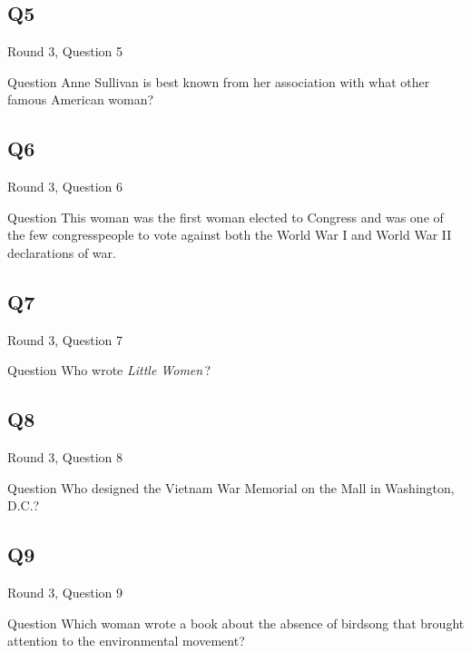 \documentclass[11pt]{beamer}
\begin{document}
\subsection*{Q5}
\begin{frame}[t]{Round 3, Question 5}
\vspace{0.5em}
\begin{block}{Question}
Anne Sullivan is best known from her association with what other famous American woman?
\end{block}
\end{frame}
    

\subsection*{Q6}
\begin{frame}[t]{Round 3, Question 6}
\vspace{0.5em}
\begin{block}{Question}
This woman was the first woman elected to Congress and was one of the few congresspeople to vote against both the World War I and World War II declarations of war.
\end{block}
\end{frame}
    

\subsection*{Q7}
\begin{frame}[t]{Round 3, Question 7}
\vspace{0.5em}
\begin{block}{Question}
Who wrote \emph{Little Women}\,?
\end{block}
\end{frame}
    

\subsection*{Q8}
\begin{frame}[t]{Round 3, Question 8}
\vspace{0.5em}
\begin{block}{Question}
Who designed the Vietnam War Memorial on the Mall in Washington, D.C.?
\end{block}
\end{frame}
    

\subsection*{Q9}
\begin{frame}[t]{Round 3, Question 9}
\vspace{0.5em}
\begin{block}{Question}
Which woman wrote a book about the absence of birdsong that brought attention to the environmental movement?
\end{block}
\end{frame}
    
\end{document}
